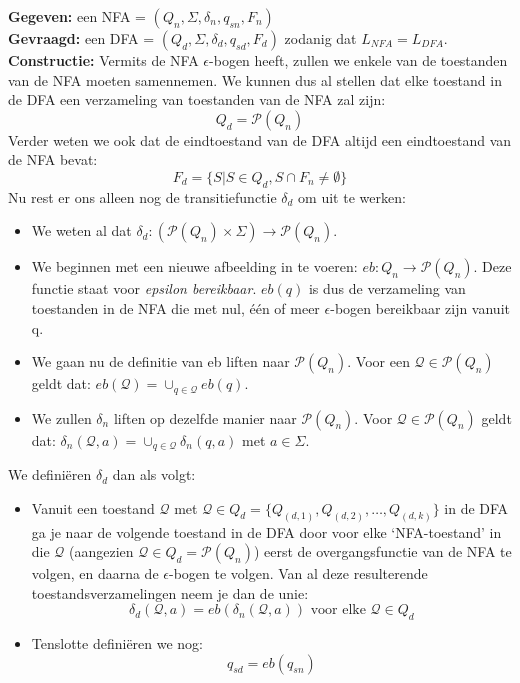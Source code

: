 \textbf{Gegeven:} een NFA = $(Q_n, \Sigma, \delta_n, q_{sn}, F_n)$ \\
\textbf{Gevraagd:} een DFA = $(Q_d, \Sigma, \delta_d, q_{sd}, F_d)$ zodanig dat $L_{NFA}=L_{DFA}$.\\
\textbf{Constructie:} Vermits de NFA $\epsilon$-bogen heeft, zullen we enkele van de toestanden van de NFA moeten samennemen. We kunnen dus al stellen dat elke toestand in de DFA een verzameling van toestanden van de NFA zal zijn:
$$ Q_d =  \mathcal{P}(Q_n)$$
Verder weten we ook dat de eindtoestand van de DFA altijd een eindtoestand van de NFA bevat:
$$ F_d = \{S | S \in Q_d, S \cap F_n \neq \emptyset \}  $$
Nu rest er ons alleen nog de transitiefunctie $\delta_d$ om uit te werken:
\begin{itemize}
\item We weten al dat $\delta_d : (\mathcal{P} (Q_n) \times \Sigma) \rightarrow \mathcal{P}(Q_n)$.
\item We beginnen met een nieuwe afbeelding in te voeren: $eb: Q_n \rightarrow \mathcal{P}(Q_n)$. Deze functie staat voor \emph{epsilon bereikbaar}. $eb(q)$ is dus de verzameling van toestanden in de NFA die met nul, \'e\'en of meer $\epsilon$-bogen bereikbaar zijn vanuit q.
\item We gaan nu de definitie van eb liften naar $\mathcal{P}(Q_n)$. Voor een $\mathcal{Q} \in \mathcal{P}(Q_n)$ geldt dat: $eb(\mathcal{Q}) = \cup_{q \in \mathcal{Q}} eb(q)$.
\item We zullen $\delta_n$ liften op dezelfde manier naar $\mathcal{P}(Q_n)$. Voor $\mathcal{Q} \in \mathcal{P}(Q_n)$ geldt dat: $\delta_n(\mathcal{Q},a) = \cup_{q \in \mathcal{Q}}\delta_n(q,a)$ met $a \in \Sigma$. 
\end{itemize}
We defini\"eren $\delta_d$ dan als volgt:
\begin{itemize}
\item Vanuit een toestand $\mathcal{Q}$ met $\mathcal{Q} \in Q_d = \{Q_{(d,1)}, Q_{(d,2)}, \dots, Q_{(d,k)}\}$  in de DFA ga je naar de volgende toestand in de DFA door voor elke `NFA-toestand' in die $\mathcal{Q}$ (aangezien $\mathcal{Q} \in Q_d = \mathcal{P}(Q_n)$) eerst de overgangsfunctie van de NFA te volgen, en daarna de $\epsilon$-bogen te volgen. Van al deze resulterende toestandsverzamelingen neem je dan de unie:
$$ \delta_d(\mathcal{Q},a) = eb(\delta_n(\mathcal{Q},a)) \text{ voor elke } \mathcal{Q} \in Q_d $$
\item Tenslotte defini\"eren we nog:
$$ q_{sd} = eb(q_{sn}) $$
\end{itemize}

